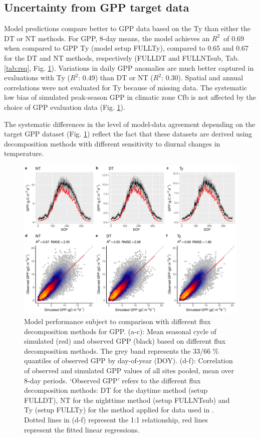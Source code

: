 \documentclass[gmd, manuscript]{copernicus}
\newcommand{\rsq}{$R^2$}
\begin{document}
\subsection{Uncertainty from GPP target data}
\label{sec:results_gppdata}

Model predictions compare better to GPP data based on the Ty than either the DT or NT methods. For GPP,  8-day means, the model achieves an \rsq\ of 0.69 when compared to GPP Ty (model setup FULL\textunderscore Ty), compared to 0.65 and 0.67 for the DT and NT methods, respectively (FULL\textunderscore DT and FULL\textunderscore NTsub, Tab. \ref{tab:rsq}, Fig. \ref{fig:modobs_10d_gppdata}). Variations in daily GPP anomalies are much better captured in evaluations with Ty (\rsq : 0.49) than DT or NT (\rsq : 0.30). Spatial and annual correlations were not evaluated for Ty because of missing data. The systematic low bias of simulated peak-season GPP in climatic zone Cfb is not affected by the choice of GPP evaluation data (Fig. \ref{fig:modobs_10d_gppdata}).

The systematic differences in the level of model-data agreement depending on the target GPP dataset (Fig. \ref{fig:modobs_10d_gppdata}) reflect the fact that these datasets are derived using decomposition methods with different sensitivity to diurnal changes in temperature.

 \begin{figure}[t]
\includegraphics[width=12cm]{fig/meandoy_modobs_gpp_data.pdf}
    \caption{Model performance subject to comparison with different flux decomposition methods for GPP. (a-c): Mean seasonal cycle of simulated (red) and observed GPP (black) based on different flux decomposition methods. The grey band represents the 33/66 \% quantiles of observed GPP by day-of-year (DOY). (d-f): Correlation of observed and simulated GPP values of all sites pooled, mean over 8-day periods. `Observed GPP' refers to the different flux decomposition methods: DT for the daytime method (setup FULL\textunderscore DT), NT for the nighttime method (setup FULL\textunderscore NTsub) and Ty (setup FULL\textunderscore Ty) for the method applied for data used in \citet{wang17rs}. Dotted lines in (d-f) represent the 1:1 relationship, red lines represent the fitted linear regressions.}
    \label{fig:modobs_10d_gppdata}
\end{figure}
\end{document}
